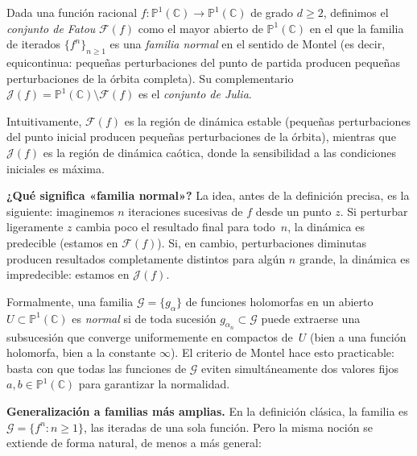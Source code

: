 \documentclass[11pt,a4paper]{article}
\theoremstyle{plain}
\theoremstyle{definition}
\theoremstyle{remark}
\newcommand{\Puno}{\mathbb{P}^1(\mathbb{C})}
\begin{document}
Dada una función racional $f:\Puno\to\Puno$ de grado $d\geq 2$,
definimos el \emph{conjunto de Fatou} $\mathcal{F}(f)$ como el mayor
abierto de $\Puno$ en el que la familia de iterados
$\{f^n\}_{n\geq 1}$ es una \emph{familia normal} en el sentido de Montel (es decir, equicontinua: pequeñas perturbaciones del punto de partida producen pequeñas perturbaciones de la órbita completa).
Su complementario $\mathcal{J}(f)=\Puno\setminus\mathcal{F}(f)$ es el
\emph{conjunto de Julia}.

Intuitivamente, $\mathcal{F}(f)$ es la región de dinámica estable
(pequeñas perturbaciones del punto inicial producen pequeñas
perturbaciones de la órbita), mientras que $\mathcal{J}(f)$ es la
región de dinámica caótica, donde la sensibilidad a las condiciones
iniciales es máxima.

\medskip
\noindent\textbf{¿Qué significa «familia normal»?}
La idea, antes de la definición precisa, es la siguiente: imaginemos 
 $n$ iteraciones sucesivas de $f$ desde un punto $z$.
Si perturbar ligeramente $z$ cambia poco el resultado final para todo~$n$,
la dinámica es predecible (estamos en $\mathcal{F}(f)$).
Si, en cambio, perturbaciones diminutas producen resultados completamente
distintos para algún $n$ grande, la dinámica es impredecible:
estamos en $\mathcal{J}(f)$.

Formalmente, una familia $\mathcal{G}=\{g_\alpha\}$ de funciones holomorfas
en un abierto $U\subset\Puno$ es \emph{normal} si de toda sucesión
$g_{\alpha_n}\subset\mathcal{G}$ puede extraerse una subsucesión que
converge uniformemente en compactos de~$U$ (bien a una función holomorfa,
bien a la constante $\infty$).
El criterio de Montel hace esto practicable: basta con que todas las
funciones de $\mathcal{G}$ eviten simultáneamente dos valores fijos
$a,b\in\Puno$ para garantizar la normalidad.

\medskip
\noindent\textbf{Generalización a familias más amplias.}
En la definición clásica, la familia es $\mathcal{G}=\{f^n:n\geq 1\}$,
las iteradas de una sola función.
Pero la misma noción se extiende de forma natural, de menos a más general:
\end{document}
